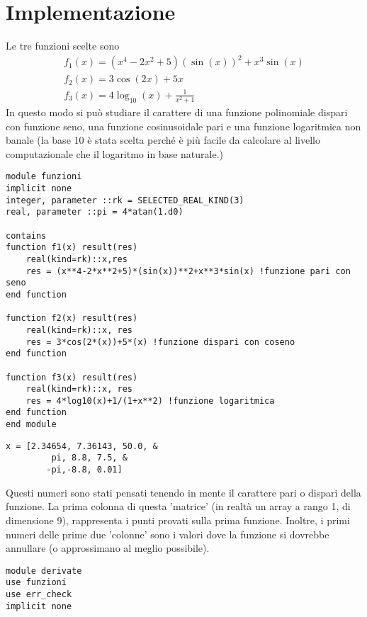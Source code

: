 \documentclass[a4paper]{article}
\begin{document}
{\section{Implementazione}
Le tre funzioni scelte sono 
\begin{gather*}
  f_1(x) = (x^4-2x^2+5)(\sin(x))^2+x^3\sin(x) \\
  f_2(x) = 3\cos(2x)+5x \\
  f_3(x) = 4\log_{10}(x)+\frac{1}{x^2+1}
\end{gather*}
In questo modo si può studiare il carattere di una funzione polinomiale dispari con funzione seno, una funzione cosinusoidale pari e una funzione logaritmica non banale (la base 10 è stata scelta perché è più facile da calcolare al livello computazionale che il logaritmo in base naturale.) 

\begin{lstlisting}[firstnumber=2]
module funzioni
implicit none
integer, parameter ::rk = SELECTED_REAL_KIND(3)
real, parameter ::pi = 4*atan(1.d0)

contains
function f1(x) result(res)
    real(kind=rk)::x,res
    res = (x**4-2*x**2+5)*(sin(x))**2+x**3*sin(x) !funzione pari con seno
end function

function f2(x) result(res)
    real(kind=rk)::x, res
    res = 3*cos(2*(x))+5*(x) !funzione dispari con coseno
end function

function f3(x) result(res)
    real(kind=rk)::x, res
    res = 4*log10(x)+1/(1+x**2) !funzione logaritmica
end function
end module
\end{lstlisting}

\begin{center}
\begin{lstlisting}[firstnumber=214]
    x = [2.34654, 7.36143, 50.0, &
         pi, 8.8, 7.5, &
        -pi,-8.8, 0.01]
\end{lstlisting}
\end{center}
Questi numeri sono stati pensati tenendo in mente il carattere pari o dispari della funzione. La prima colonna di questa 'matrice' (in realtà un array a rango 1, di dimensione 9), rappresenta i punti provati sulla prima funzione. Inoltre, i primi numeri delle prime due 'colonne' sono i valori dove la funzione si dovrebbe annullare (o approssimano al meglio possibile). 

\begin{lstlisting}[firstnumber = 105]
module derivate
use funzioni
use err_check
implicit none


\end{lstlisting}}
\end{document}
